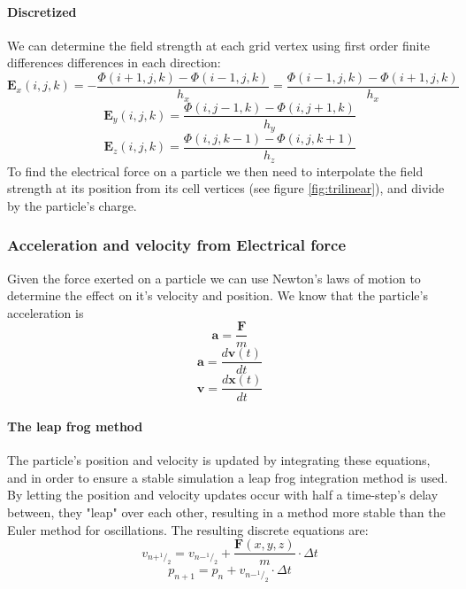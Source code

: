 \paragraph{Discretized}
We can determine the field strength at each grid vertex using first order finite differences differences in each direction:
$$ \mathbf{E}_x(i, j, k) = -\frac{\Phi(i+1, j, k) - \Phi(i-1, j, k)}{h_x} = \frac{\Phi(i-1, j, k) - \Phi(i+1, j, k)}{h_x}$$
$$ \mathbf{E}_y(i, j, k) = \frac{\Phi(i, j-1, k) - \Phi(i, j+1, k)}{h_y} $$
$$ \mathbf{E}_z(i, j, k) = \frac{\Phi(i, j, k-1) - \Phi(i, j, k+1)}{h_z} $$
To find the electrical force on a particle we then need to interpolate the field strength at its position from its cell
vertices (see figure \ref{fig:trilinear}), and divide by the particle's charge.

\subsubsection{Acceleration and velocity from Electrical force}
Given the force exerted on a particle we can use Newton's laws of motion to determine the effect on
it's velocity and position. We know that the particle's acceleration is
$$\mathbf{a} = \frac{\mathbf{F}}{m}$$
$$\mathbf{a} = \frac{d\mathbf{v}(t)}{dt}$$
$$\mathbf{v} = \frac{d\mathbf{x}(t)}{dt}$$

\paragraph{The leap frog method}
The particle's position and velocity is updated by integrating these equations, and in order to ensure a stable
simulation a leap frog integration method is used. By letting the position and velocity updates occur with half a
time-step's delay between, they "leap" over each other, resulting in a method more stable than the Euler method for
oscillations. The resulting discrete equations are:
$$v_{n+^{\!1}/_2} = v_{n-^{1\!}/_2} + \frac{\mathbf{F}(x, y, z)}{m}\cdot \Delta t$$
$$p_{n+1} = p_n + v_{n-^{1\!}/_2}\cdot \Delta t$$

